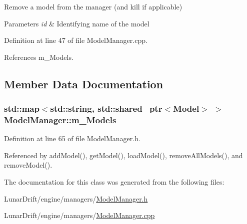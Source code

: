 Remove a model from the manager (and kill if applicable) 


\begin{DoxyParams}{Parameters}
{\em id} & Identifying name of the model \\
\hline
\end{DoxyParams}


Definition at line 47 of file Model\+Manager.\+cpp.



References m\+\_\+\+Models.



\subsection{Member Data Documentation}
\subsubsection[{\texorpdfstring{m\+\_\+\+Models}{m_Models}}]{\setlength{\rightskip}{0pt plus 5cm}std\+::map$<$std\+::string, std\+::shared\+\_\+ptr$<${\bf Model}$>$ $>$ Model\+Manager\+::m\+\_\+\+Models\hspace{0.3cm}{\ttfamily [private]}}\hypertarget{class_model_manager_a3ce5116dfeff87737e315a4df49bde54}{}\label{class_model_manager_a3ce5116dfeff87737e315a4df49bde54}


Definition at line 65 of file Model\+Manager.\+h.



Referenced by add\+Model(), get\+Model(), load\+Model(), remove\+All\+Models(), and remove\+Model().



The documentation for this class was generated from the following files\+:\begin{DoxyCompactItemize}
\item 
Lunar\+Drift/engine/managers/\hyperlink{_model_manager_8h}{Model\+Manager.\+h}\item 
Lunar\+Drift/engine/managers/\hyperlink{_model_manager_8cpp}{Model\+Manager.\+cpp}\end{DoxyCompactItemize}
